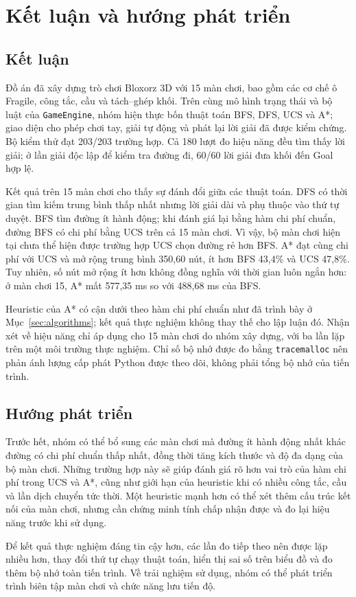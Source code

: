 \section{Kết luận và hướng phát triển}

\subsection{Kết luận}

Đồ án đã xây dựng trò chơi Bloxorz 3D với 15 màn chơi, bao gồm các cơ chế ô
Fragile, công tắc, cầu và tách--ghép khối. Trên cùng mô hình trạng thái và bộ
luật của \texttt{GameEngine}, nhóm hiện thực bốn thuật toán BFS, DFS, UCS và A*;
giao diện cho phép chơi tay, giải tự động và phát lại lời giải đã được kiểm
chứng. Bộ kiểm thử đạt 203/203 trường hợp. Cả 180 lượt đo hiệu năng đều tìm
thấy lời giải; ở lần giải độc lập để kiểm tra đường đi, 60/60 lời giải đưa khối
đến Goal hợp lệ.

Kết quả trên 15 màn chơi cho thấy sự đánh đổi giữa các thuật toán. DFS có thời
gian tìm kiếm trung bình thấp nhất nhưng lời giải dài và phụ thuộc vào thứ tự
duyệt. BFS tìm đường ít hành động; khi đánh giá lại bằng hàm chi phí chuẩn,
đường BFS có chi phí bằng UCS trên cả 15 màn chơi. Vì vậy, bộ màn chơi hiện tại
chưa thể hiện được trường hợp UCS chọn đường rẻ hơn BFS. A* đạt cùng chi phí
với UCS và mở rộng trung bình 350,60 nút, ít hơn BFS 43,4\% và UCS 47,8\%.
Tuy nhiên, số nút mở rộng ít hơn không đồng nghĩa với thời gian luôn ngắn hơn:
ở màn chơi 15, A* mất 577,35 ms so với 488,68 ms của BFS.

Heuristic của A* có cận dưới theo hàm chi phí chuẩn như đã trình bày ở
Mục~\ref{sec:algorithms}; kết quả thực nghiệm không thay thế cho lập luận đó.
Nhận xét về hiệu năng chỉ áp dụng cho 15 màn chơi do nhóm xây dựng, với ba lần
lặp trên một môi trường thực nghiệm. Chỉ số bộ nhớ được đo bằng
\texttt{tracemalloc} nên phản ánh lượng cấp phát Python được theo dõi, không phải
tổng bộ nhớ của tiến trình.

\subsection{Hướng phát triển}

Trước hết, nhóm có thể bổ sung các màn chơi mà đường ít hành động nhất khác
đường có chi phí chuẩn thấp nhất, đồng thời tăng kích thước và độ đa dạng của
bộ màn chơi. Những trường hợp này sẽ giúp đánh giá rõ hơn vai trò của hàm chi
phí trong UCS và A*, cũng như giới hạn của heuristic khi có nhiều công tắc,
cầu và lần dịch chuyển tức thời. Một heuristic mạnh hơn có thể xét thêm cấu
trúc kết nối của màn chơi, nhưng cần chứng minh tính chấp nhận được và đo lại
hiệu năng trước khi sử dụng.

Để kết quả thực nghiệm đáng tin cậy hơn, các lần đo tiếp theo nên được lặp
nhiều hơn, thay đổi thứ tự chạy thuật toán, hiển thị sai số trên biểu đồ và đo thêm bộ
nhớ toàn tiến trình. Về trải nghiệm sử dụng, nhóm có thể phát triển trình biên
tập màn chơi và chức năng lưu tiến độ.
